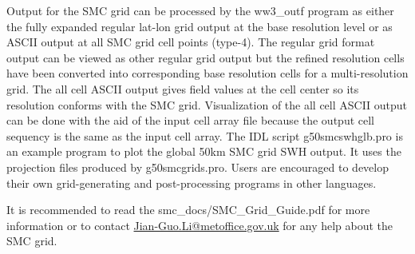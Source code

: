 Output for the SMC grid can be processed by the ww3\_outf program
as either the fully expanded regular lat-lon grid output at the base
resolution level or as ASCII output at all SMC grid cell points (type-4).
The regular grid format output can be viewed as other regular grid
output but the refined resolution cells have been converted into 
corresponding base resolution cells for a multi-resolution grid. 
The all cell ASCII output gives field values at the cell center
so its resolution conforms with the SMC grid. Visualization of the
all cell ASCII output can be done with the aid of the input cell array
file because the output cell sequency is the same as the input cell
array. The IDL script g50smcswhglb.pro is an example program to plot
the global 50km SMC grid SWH output. It uses the projection files
produced by g50smcgrids.pro. Users are encouraged to develop their
own grid-generating and post-processing programs in other languages.

It is recommended to read the smc\_docs/SMC\_Grid\_Guide.pdf for
more information or to contact \url{Jian-Guo.Li@metoffice.gov.uk} 
for any help about the SMC grid.

